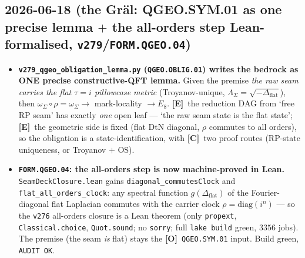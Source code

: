 \documentclass[11pt]{article}
\providecommand{\mE}{\textbf{[E]}}\providecommand{\mC}{\textbf{[C]}}
\providecommand{\mO}{\textbf{[O]}}\providecommand{\mX}{\textbf{[X]}}
\providecommand{\vref}[1]{\texttt{#1}}
\begin{document}
\subsection*{2026-06-18 (the Gr\"al: QGEO.SYM.01 as one precise lemma $+$ the all-orders step Lean-formalised, \texttt{v279}/\texttt{FORM.QGEO.04})}
\begin{itemize}
\item \textbf{\texttt{v279\_qgeo\_obligation\_lemma.py} (\texttt{QGEO.OBLIG.01}) writes the bedrock as ONE precise
  constructive-QFT lemma.} Given the premise \emph{the raw seam carries the flat $\tau{=}i$ pillowcase metric}
  (Troyanov-unique, $\Lambda_\Sigma{=}\sqrt{-\Delta_{\mathrm{flat}}}$), then $\omega_\Sigma\circ\rho=\omega_\Sigma
  \to$ mark-locality $\to E_8$. \mE\ the reduction DAG from `free RP seam' has exactly \emph{one} open leaf ---
  `the raw seam state is the flat state'; \mE\ the geometric side is fixed (flat DtN diagonal, $\rho$ commutes to
  all orders), so the obligation is a state-identification, with \mC\ two proof routes (RP-state uniqueness, or
  Troyanov $+$ OS).
\item \textbf{\texttt{FORM.QGEO.04}: the all-orders step is now machine-proved in Lean.}
  \texttt{SeamDeckClosure.lean} gains \texttt{diagonal\_commutesClock} and
  \texttt{flat\_all\_orders\_clock}: any spectral function $g(\Delta_{\mathrm{flat}})$ of the Fourier-diagonal
  flat Laplacian commutes with the carrier clock $\rho{=}\mathrm{diag}(i^n)$ --- so the \vref{v276} all-orders
  closure is a Lean theorem (only \texttt{propext}, \texttt{Classical.choice}, \texttt{Quot.sound}; no
  \texttt{sorry}; full \texttt{lake build} green, $3356$ jobs). The premise (the seam \emph{is} flat) stays the
  \mO\ \texttt{QGEO.SYM.01} input. Build green, \texttt{AUDIT OK}.
\end{itemize}
\end{document}
